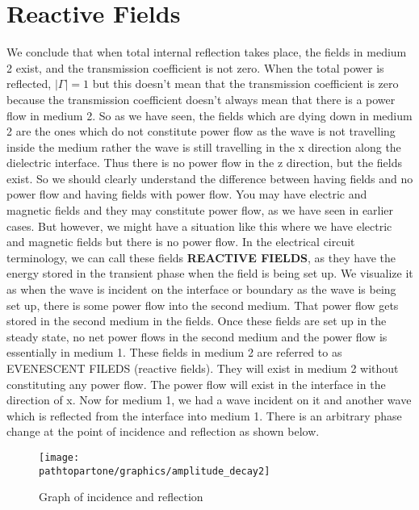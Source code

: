 \section{Reactive Fields}

We conclude that when total internal reflection takes place, the fields in medium 2 exist, and the transmission coefficient is not zero. When the total power is reflected, $|\Gamma| = 1$ but this doesn't mean that the transmission coefficient is zero because the transmission coefficient doesn't always mean that there is a power flow in medium 2. So as we have seen, the fields which are dying down in medium 2 are the ones which do not constitute power flow as the wave is not travelling inside the medium rather the wave is still travelling in the x direction along the dielectric interface. Thus there is no power flow in the z direction, but the fields exist. So we should clearly understand the difference between having fields and no power flow and having fields with power flow. You may have electric and magnetic fields and they may constitute power flow, as we have seen in earlier cases. But however, we might have a situation like this where we have electric and magnetic fields but there is no power flow. In the electrical circuit terminology, we can call these fields \textbf{ REACTIVE FIELDS}, as they have the energy stored in the transient phase when the field is being set up. We visualize it as when the wave is incident on the interface or boundary as the wave is being set up, there is some power flow into the second medium. That power flow gets stored in the second medium in the fields. Once these fields are set up in the steady state, no net power flows in the second medium and the power flow is essentially in medium 1. These fields in medium 2 are referred to as EVENESCENT FILEDS (reactive fields). They will exist in medium 2 without constituting any power flow. The power flow will exist in the interface in the direction of x. 
Now for medium 1, we had a wave incident on it and another wave which is reflected from the interface into medium 1. There is an arbitrary phase change at the point of incidence and reflection as shown below.
\begin{figure}[h]
\centering
\texttt{[image: \\pathtopartone/graphics/amplitude\_decay2]}
\caption{Graph of incidence and reflection}
\end{figure}

